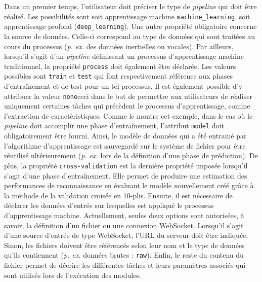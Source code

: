 Dans un premier temps, l'utilisateur doit préciser le type de \textit{pipeline} qui doit être réalisé. Les possibilités sont soit apprentissage machine \texttt{machine\_learning}, soit apprentissage profond (\texttt{deep\_learning}). Une autre propriété obligatoire concerne la source de données. Celle-ci correspond au type de données qui sont traitées au cours du processus (\textit{p. ex.} des données inertielles ou vocales). Par ailleurs, lorsqu'il s'agit d'un \textit{pipeline} définissant un processus d'apprentissage machine traditionnel, la propriété \texttt{process} doit également être déclarée. Les valeurs possibles sont \texttt{train} et \texttt{test} qui font respectivement référence aux phases d'entraînement et de test pour un tel processus. Il est également possible d'y attribuer la valeur \texttt{none}\textemdash ceci dans le but de permettre aux utilisateurs de réaliser uniquement certaines tâches qui précèdent le processus d'apprentissage, comme l'extraction de caractéristiques. Comme le montre cet exemple, dans le cas où le \textit{pipeline} doit accomplir une phase d'entraînement, l'attribut \texttt{model} doit obligatoirement être fourni. Ainsi, le modèle de données qui a été entrainé par l'algorithme d'apprentissage est sauvegardé sur le système de fichier pour être réutilisé ultérieurement (\textit{p. ex.} lors de la définition d'une phase de prédiction). De plus, la propriété \texttt{cross-validation} est la dernière propriété imposée lorsqu'il s'agit d'une phase d'entraînement. Elle permet de produire une estimation des performances de reconnaissance en évaluant le modèle nouvellement créé grâce à la méthode de la validation croisée en 10-plis. Ensuite, il est nécessaire de déclarer les données d'entrée sur lesquelles est appliqué le processus d'apprentissage machine. Actuellement, seules deux options sont autorisées, à savoir, la définition d'un fichier ou une connexion WebSocket. Lorsqu'il s'agit d'une source d'entrée de type WebSocket, l'\acs{URL} du serveur doit être indiquée. Sinon, les fichiers doivent être référencés selon leur nom et le type de données qu'ils contiennent (\textit{p. ex.} données brutes : \texttt{raw}). Enfin, le reste du contenu du fichier permet de décrire les différentes tâches et leurs paramètres associés qui sont utilisés lors de l'exécution des modules.

